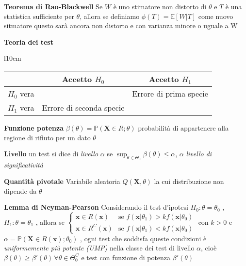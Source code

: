 \documentclass[openany]{book} %
\begin{document}
\textbf{Teorema di Rao-Blackwell} Se $W$ è uno stimatore non distorto di $\theta$ e $T$ è una statistica sufficiente per $\theta$, allora se definiamo $\phi(T)=\mathbb{E}[W|T]$ come nuovo sitmatore questo sarà ancora non distorto e con varianza minore o uguale a W

\textbf{Teoria dei test}

\begin {wraptable}{l}{10cm}

\begin{tabular}{c|c|c}

	           & Accetto $H_0 $           & Accetto $H_1$          \\

	\hline

	$H_0$ vera & \checkmark               & Errore di prima specie \\

	$H_1$ vera & Errore di seconda specie & \checkmark
\end{tabular}

\end {wraptable}

\textbf{Funzione potenza} $\beta(\theta)=\mathbb{P}(\boldsymbol{X}\in R;\theta)$ probabilità di appartenere alla regione di rifiuto per un dato $\theta$

\textbf{Livello} un test si dice di \textit{livello} $\alpha$ se $\sup_ {\theta\in\Theta_0}\beta(\theta)\leq\alpha$, $\alpha$ \textit{livello di significatività}

\textbf{Quantità pivotale} Variabile aleatoria $Q(\boldsymbol{X},\theta)$ la cui distribuzione non dipende da $\theta$

\textbf{Lemma di Neyman-Pearson} Considerando il test d'ipotesi $H_0:\theta = \theta_0$ , $H_1:\theta = \theta_1$ , allora se $\left\{ \begin{array}{ll}
		\boldsymbol{x}\in R(\boldsymbol{x})   & \text{se } f(\boldsymbol{x}|\theta_1)>kf(\boldsymbol{x}|\theta_0) \\
		\boldsymbol{x}\in R^C(\boldsymbol{x}) & \text{se } f(\boldsymbol{x}|\theta_1)<kf(\boldsymbol{x}|\theta_0)\end{array}\right.$
con $k>0$ e $\alpha =\mathbb{P}(\boldsymbol{X}\in R(\boldsymbol{x});\theta_0)$ , ogni test che soddisfa queste condizioni è \textit{uniformemente più potente (UMP)} nella classe dei test di livello $\alpha$, cioè $\beta(\theta)\geq\beta'(\theta)\,\forall\theta\in\Theta_0^C$ e test con funzione di potenza $\beta'(\theta)$
\end{document}
